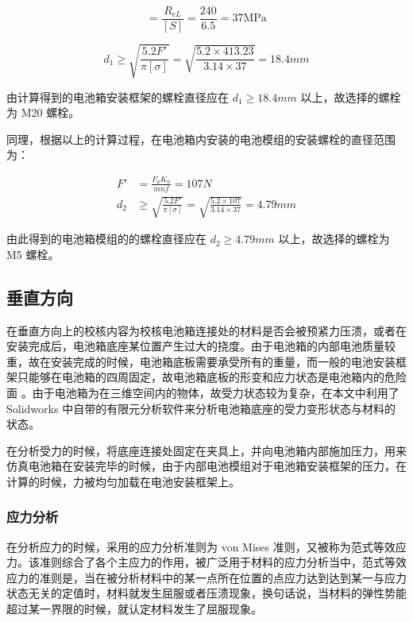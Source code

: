 \begin{equation}
	[\sigma]=\frac{R_{eL}}{[S]}=\frac{240}{6.5}=37 \mathrm{MPa}
\end{equation}

\begin{equation}
	d_1 \geq \sqrt{\frac{5.2F'}{\pi[\sigma]}}=\sqrt{\frac{5.2 \times 413.23}{3.14 \times 37}}=18.4 mm
\end{equation}

由计算得到的电池箱安装框架的螺栓直径应在 $d_1 \geq 18.4 mm $ 以上，故选择的螺栓为 M20 螺栓。

同理，根据以上的计算过程，在电池箱内安装的电池模组的安装螺栓的直径范围为：



\begin{equation}
\begin{aligned}
	F'&=\frac{F_aK_n}{mnf} = 107 N \\
	d_2 &\geq \sqrt{\frac{5.2F'}{\pi[\sigma]}}=\sqrt{\frac{5.2 \times 107}{3.14 \times 37}}=4.79 mm
\end{aligned}
\end{equation}

由此得到的电池箱模组的的螺栓直径应在 $d_2 \geq 4.79 mm $ 以上，故选择的螺栓为 M5 螺栓。

\subsection{垂直方向}

在垂直方向上的校核内容为校核电池箱连接处的材料是否会被预紧力压溃，或者在安装完成后，电池箱底座某位置产生过大的挠度。由于电池箱的内部电池质量较重，故在安装完成的时候，电池箱底板需要承受所有的重量，而一般的电池安装框架只能够在电池箱的四周固定，故电池箱底板的形变和应力状态是电池箱内的危险面 \cite{王兵2014电动汽车电池箱仿真分析及设计优化}。由于电池箱为在三维空间内的物体，故受力状态较为复杂，在本文中利用了 Solidworks 中自带的有限元分析软件来分析电池箱底座的受力变形状态与材料的状态。

在分析受力的时候，将底座连接处固定在夹具上，并向电池箱内部施加压力，用来仿真电池箱在安装完毕的时候，由于内部电池模组对于电池箱安装框架的压力，在计算的时候，力被均匀加载在电池安装框架上。

\subsubsection{应力分析}

在分析应力的时候，采用的应力分析准则为 von Mises 准则，又被称为范式等效应力。该准则综合了各个主应力的作用，被广泛用于材料的应力分析当中，范式等效应力的准则是，当在被分析材料中的某一点所在位置的点应力达到达到某一与应力状态无关的定值时，材料就发生屈服或者压溃现象，换句话说，当材料的弹性势能超过某一界限的时候，就认定材料发生了屈服现象。

